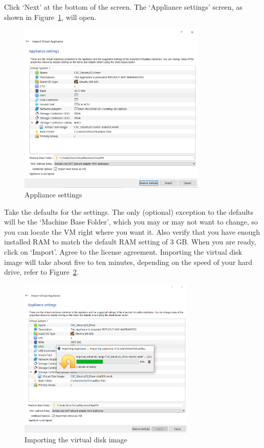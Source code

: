Click `Next' at the bottom of the screen.  The `Appliance settings' screen, as shown in Figure~\ref{fg:virt-4}, will open.  

\begin{figure}[H]
\begin{center}
\includegraphics[width=0.8\textwidth]{virt-4}
\caption{Appliance settings}\label{fg:virt-4}
\end{center}
\end{figure}

Take the defaults for the settings.  The only (optional) exception to the defaults will be the `Machine Base Folder', which you may or may not want to change, so you can locate the VM right where you want it.  Also verify that you have enough installed RAM to match the default RAM setting of 3 GB.  When you are ready, click on `Import'.  Agree to the license agreement.  Importing the virtual disk image will take about five to ten minutes, depending on the speed of your hard drive, refer to Figure~\ref{fg:virt-5}.

\begin{figure}[H]
\begin{center}
\includegraphics[width=0.75\textwidth]{virt-5}
\caption{Importing the virtual disk image}\label{fg:virt-5}
\end{center}
\end{figure}

